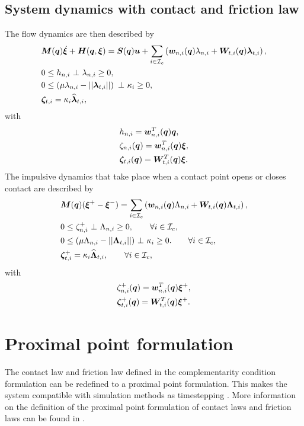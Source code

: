 \documentclass[DC2017114Bouma.tex]{subfiles}
\begin{document}
\subsection{System dynamics with contact and friction law}
The flow dynamics are then described by
\begin{align}
&\Mb(\qb)\dot{\xib} + \Hb(\qb,\xib) = \Sb(\qb)\ub + \sum_{i\in\Ic_c}\left(\wb_{n,i}(\qb)\lambda_{n,i} + \Wb_{t,i}(\qb)\lambdab_{t,i} \right), \label{eq:ncpcontact1}\\
&0\leq h_{n,i}\ \bot\ \lambda_{n,i} \geq 0,\label{eq:ncpcontact2}\\
&0\leq \left(\mu\lambda_{n,i} - ||\lambdab_{t,i}||\right)\ \bot\ \kappa_i \geq 0,\label{eq:ncpcontact3}\\
&\zetab_{t,i} = \kappa_i\widehat{\lambdab}_{t,i},\label{eq:ncpcontact4}
\end{align}
with 
\begin{align}
&h_{n,i} = {\boldsymbol{w}}_{n,i}^T({\boldsymbol{q}}){\boldsymbol{q}},\label{eq:h}\\
&\zeta_{n,i}({\boldsymbol{q}}) = {\boldsymbol{w}}^T_{n,i}({\boldsymbol{q}}) \boldsymbol{\xi},  \label{eq:zetan}\\
&\boldsymbol{\zeta}_{t,i}({\boldsymbol{q}}) = {\boldsymbol{W}}^T_{t,i}({\boldsymbol{q}}) \boldsymbol{\xi}. \label{eq:zetab}
\end{align}
The impulsive dynamics that take place when a contact point opens or closes contact are described by
\begin{align}
&{\boldsymbol{M}}({\boldsymbol{q}})(\boldsymbol{\xi}^+ - \boldsymbol{\xi}^-) = \sum_{i\in\mathcal{I}_c}\left( {\boldsymbol{w}}_{n,i}({\boldsymbol{q}})\Lambda_{n,i} + {\boldsymbol{W}}_{t,i}({\boldsymbol{q}})\boldsymbol{\Lambda}_{t,i}\right), \label{eq:ncpimpact1}\\
&0\leq \zeta_{n,i}^+\ \bot\ \Lambda_{n,i} \geq 0, \qquad \forall i\in\mathcal{I}_c,\label{eq:ncpimpact2}\\
&0 \leq (\mu\Lambda_{n,i} - ||\boldsymbol{\Lambda}_{t,i}||)\ \bot\ \kappa_i \geq 0. \qquad \forall i\in\mathcal{I}_c,\label{eq:ncpimpact3}\\
&\boldsymbol{\zeta}_{t,i}^+ = \kappa_i\widehat{\boldsymbol{\Lambda}}_{t,i},\qquad \forall i\in\mathcal{I}_c,\label{eq:ncpimpact4}
\end{align}
with 
\begin{align}
&\zeta^+_{n,i}({\boldsymbol{q}}) = {\boldsymbol{w}}^T_{n,i}({\boldsymbol{q}}) \boldsymbol{\xi}^+,\\
&\boldsymbol{\zeta}^+_{t,i}({\boldsymbol{q}}) = {\boldsymbol{W}}^T_{t,i}({\boldsymbol{q}}) \boldsymbol{\xi}^+.\label{eq:ncpimpactend}
\end{align}

\section{Proximal point formulation}
The contact law and friction law defined in the complementarity condition formulation can be redefined to a proximal point formulation. This makes the system compatible with simulation methods as timestepping \cite[Chapter 10]{Acary2008}. More information on the definition of the proximal point formulation of contact laws and friction laws can be found in \cite[Section 5.3]{Leine2008}.
\end{document}
